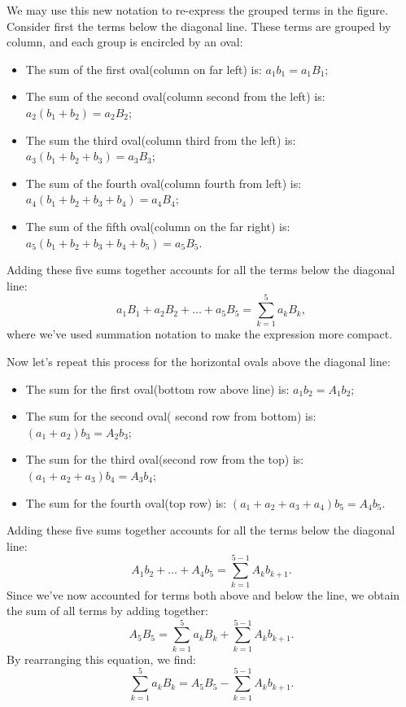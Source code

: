 We may use this new notation to 
re-express the grouped terms in the figure. 
Consider first the terms below the diagonal line. These terms are grouped by column, and each group is encircled by an oval:
\begin{itemize}
\item
The sum of the first oval(column on far left) is: $a_{1}b_{1}= a_{1}B_{1}$;
 \item
The sum of the second oval(column second from the left) is: $a_{2}\left ( b_{1}+b_{2} \right )= a_{2}B_{2}$;
\item
The sum the third oval(column third from the left) is: $a_{3}\left ( b_{1}+b_{2}+b_{3} \right )= a_{3}B_{3}$;
\item
The sum of the fourth oval(column fourth from left) is: $a_{4}\left ( b_{1}+b_{2}+b_{3}+b_{4} \right )= a_{4}B_{4}$;
\item 
The sum of the fifth oval(column on the far right) is: $a_{5}\left (b _{1}+b_{2}+b_{3}+b_{4}+b_{5} \right )=a _{5}B_{5}$.
\end{itemize}
Adding these five sums together accounts for all the terms below the diagonal line:
\[ a_1B_1 + a_2B_2 + \ldots + a_5B_5 = \sum_{k=1}^{5}a_kB_k,\]
where we've used summation notation to make the expression more compact.

Now let's repeat this process for the horizontal ovals above the diagonal line:
\begin{itemize}
\item
The sum for the first oval(bottom row above line) is: $a_{1}b_{2}= A_{1}b_{2}$;
\item
The sum for the second oval( second row from bottom) is: $\left ( a_{1}+a_{2} \right)b_{3}= A_{2}b_{3}$;
\item
The sum for the third oval(second row from the top) is: $\left ( a_{1}+a_{2}+a_{3} \right )b_{4}= A_{3}b_{4}$;
\item
The sum for the fourth oval(top row) is: $\left ( a_{1}+a_{2}+a_{3}+a_{4} \right)b_{5}= A_{4}b_{5}$.
\end{itemize}
Adding these five sums together accounts for all the terms below the diagonal line:
\[ A_1b_2 +  \ldots + A_4b_5 = \sum_{k=1}^{5-1}A_kb_{k+1}.\]
Since we've now accounted for terms both above and below the line, we obtain the sum of all terms by adding together:
\[ A_{5}B_{5}= \sum_{k=1}^{5}a_{k}B_{k}+\sum_{k=1}^{5-1}A_{k}b_{k+1}. \]
By rearranging this equation, we find:
\[ \sum_{k=1}^{5}a_{k}B_{k}= A_{5}B_{5}-\sum_{k=1}^{5-1}A_{k}b_{k+1}. \]

